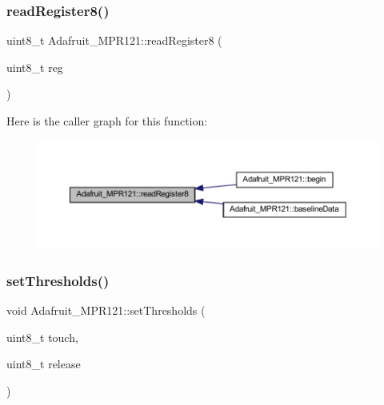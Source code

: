 \subsubsection{\texorpdfstring{read\+Register8()}{readRegister8()}}
{\footnotesize\ttfamily uint8\+\_\+t Adafruit\+\_\+\+M\+P\+R121\+::read\+Register8 (\begin{DoxyParamCaption}\item[{uint8\+\_\+t}]{reg }\end{DoxyParamCaption})}

Here is the caller graph for this function\+:
\nopagebreak
\begin{figure}[H]
\begin{center}
\leavevmode
\includegraphics[width=350pt]{d9/d2e/class_adafruit___m_p_r121_a344c416d709121094a21d6892e23d28e_icgraph}
\end{center}
\end{figure}
\mbox{\label{class_adafruit___m_p_r121_a8588eabc494059b6fe5231b8dd2be416}} 
\subsubsection{\texorpdfstring{set\+Thresholds()}{setThresholds()}}
{\footnotesize\ttfamily void Adafruit\+\_\+\+M\+P\+R121\+::set\+Thresholds (\begin{DoxyParamCaption}\item[{uint8\+\_\+t}]{touch,  }\item[{uint8\+\_\+t}]{release }\end{DoxyParamCaption})}

